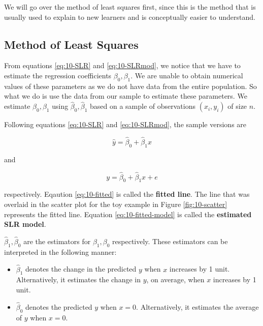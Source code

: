 \documentclass[
]{book}
\providecommand{\tightlist}{%
  \setlength{\itemsep}{0pt}\setlength{\parskip}{0pt}}
\begin{document}
We will go over the method of least squares first, since this is the method that is usually used to explain to new learners and is conceptually easier to understand.

\hypertarget{method-of-least-squares}{%
\subsection{Method of Least Squares}\label{method-of-least-squares}}

From equations \eqref{eq:10-SLR} and \eqref{eq:10-SLRmod}, we notice that we have to estimate the regression coefficients \(\beta_0, \beta_1\). We are unable to obtain numerical values of these parameters as we do not have data from the entire population. So what we do is use the data from our sample to estimate these parameters. We estimate \(\beta_0,\beta_1\) using \(\hat{\beta}_0,\hat{\beta}_1\) based on a sample of observations \((x_i,y_i)\) of size \(n\).

Following equations \eqref{eq:10-SLR} and \eqref{eq:10-SLRmod}, the sample versions are

\begin{equation} 
\hat{y}=\hat{\beta}_0+\hat{\beta}_1 x
\label{eq:10-fitted}
\end{equation}

and

\begin{equation} 
y=\hat{\beta}_0+\hat{\beta}_1 x + e
\label{eq:10-fitted-model}
\end{equation}

respectively. Eqaution \eqref{eq:10-fitted} is called the \textbf{fitted line}. The line that was overlaid in the scatter plot for the toy example in Figure \ref{fig:10-scatter} represents the fitted line. Equation \eqref{eq:10-fitted-model} is called the \textbf{estimated SLR model}.

\(\hat{\beta}_1,\hat{\beta}_0\) are the estimators for \(\beta_1,\beta_0\) respectively. These estimators can be interpreted in the following manner:

\begin{itemize}
\tightlist
\item
  \(\hat{\beta}_1\) denotes the change in the predicted \(y\) when \(x\) increases by 1 unit. Alternatively, it estimates the change in \(y\), on average, when \(x\) increases by 1 unit.
\item
  \(\hat{\beta}_0\) denotes the predicted \(y\) when \(x=0\). Alternatively, it estimates the average of \(y\) when \(x=0\).
\end{itemize}
\end{document}
